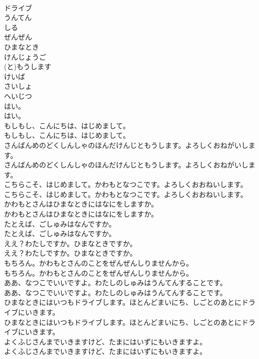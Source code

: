\documentclass[8pt]{extreport}
\begin{document}
\begin{CJK}{UTF8}{min}
\\	ドライブ
\\	うんてん
\\	しる
\\	ぜんぜん
\\	ひまなとき
\\	けんじょうご
\\	(と)もうします
\\	けいば
\\	さいしょ
\\	へいじつ
\\	はい。	
\\	はい。 
\\	もしもし、こんにちは、はじめまして。	
\\	もしもし、こんにちは、はじめまして。 
\\	さんばんめのどくしんしゃのほんだけんじともうします。よろしくおねがいします。	
\\	さんばんめのどくしんしゃのほんだけんじともうします。よろしくおねがいします。 
\\	こちらこそ、はじめまして。かわもとなつこです。よろしくおおねいします。	
\\	こちらこそ、はじめまして。かわもとなつこです。よろしくおおねいします。 
\\	かわもとさんはひまなときにはなにをしますか。	
\\	かわもとさんはひまなときにはなにをしますか。 
\\	たとえば、ごしゅみはなんですか。	
\\	たとえば、ごしゅみはなんですか。 
\\	ええ？わたしですか。ひまなときですか。	
\\	ええ？わたしですか。ひまなときですか。 
\\	もちろん。かわもとさんのことをぜんぜんしりませんから。	
\\	もちろん。かわもとさんのことをぜんぜんしりませんから。 
\\	ああ、なつこでいいですよ。わたしのしゅみはうんてんすることです。	
\\	ああ、なつこでいいですよ。わたしのしゅみはうんてんすることです。 
\\	ひまなときにはいつもドライブします。ほとんどまいにち、しごとのあとにドライブにいきます。	
\\	ひまなときにはいつもドライブします。ほとんどまいにち、しごとのあとにドライブにいきます。 
\\	よくふじさんまでいきますけど、たまにはいずにもいきますよ。	
\\	よくふじさんまでいきますけど、たまにはいずにもいきますよ。 

\end{CJK}
\end{document}
